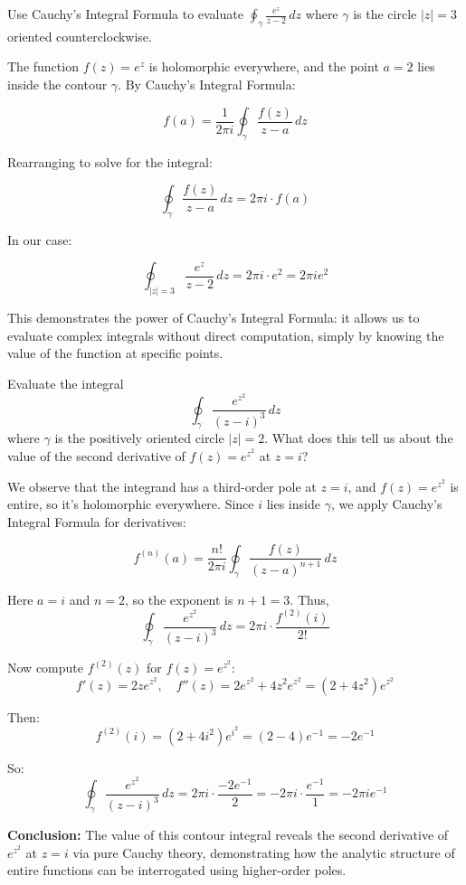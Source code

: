 \exampleline
\begin{example}
Use Cauchy's Integral Formula to evaluate $\oint_{\gamma} \frac{e^z}{z-2} \, dz$ where $\gamma$ is the circle $|z| = 3$ oriented counterclockwise.

\begin{solution}
The function $f(z) = e^z$ is holomorphic everywhere, and the point $a = 2$ lies inside the contour $\gamma$. By Cauchy's Integral Formula:

\[
f(a) = \frac{1}{2\pi i} \oint_{\gamma} \frac{f(z)}{z-a} \, dz
\]

Rearranging to solve for the integral:

\[
\oint_{\gamma} \frac{f(z)}{z-a} \, dz = 2\pi i \cdot f(a)
\]

In our case:

\[
\oint_{|z|=3} \frac{e^z}{z-2} \, dz = 2\pi i \cdot e^2 = 2\pi i e^2
\]

\noindent This demonstrates the power of Cauchy's Integral Formula: it allows us to evaluate complex integrals without direct computation, simply by knowing the value of the function at specific points.
\end{solution}
\end{example}
\exampleline
\begin{example}
Evaluate the integral
\[
\oint_{\gamma} \frac{e^{z^2}}{(z - i)^3} \, dz
\]
where \( \gamma \) is the positively oriented circle \( |z| = 2 \). What does this tell us about the value of the second derivative of \( f(z) = e^{z^2} \) at \( z = i \)?
\begin{solution}
We observe that the integrand has a third-order pole at \( z = i \), and \( f(z) = e^{z^2} \) is entire, so it's holomorphic everywhere. Since \( i \) lies inside \( \gamma \), we apply Cauchy’s Integral Formula for derivatives:

\[
f^{(n)}(a) = \frac{n!}{2\pi i} \oint_\gamma \frac{f(z)}{(z - a)^{n+1}} \, dz
\]

\noindent Here \( a = i \) and \( n = 2 \), so the exponent is \( n+1 = 3 \). Thus,
\[
\oint_{\gamma} \frac{e^{z^2}}{(z - i)^3} \, dz = 2\pi i \cdot \frac{f^{(2)}(i)}{2!}
\]

\noindent Now compute \( f^{(2)}(z) \) for \( f(z) = e^{z^2} \):
\[
f'(z) = 2z e^{z^2}, \quad f''(z) = 2e^{z^2} + 4z^2 e^{z^2} = (2 + 4z^2)e^{z^2}
\]

\noindent Then:
\[
f^{(2)}(i) = (2 + 4i^2)e^{i^2} = (2 - 4)e^{-1} = -2e^{-1}
\]

\noindent So:
\[
\oint_{\gamma} \frac{e^{z^2}}{(z - i)^3} \, dz = 2\pi i \cdot \frac{-2e^{-1}}{2} = -2\pi i \cdot \frac{e^{-1}}{1} = -2\pi i e^{-1}
\]

\noindent \textbf{Conclusion:} The value of this contour integral reveals the second derivative of \( e^{z^2} \) at \( z = i \) via pure Cauchy theory, demonstrating how the analytic structure of entire functions can be interrogated using higher-order poles.
\end{solution}
\end{example}
\exampleline

